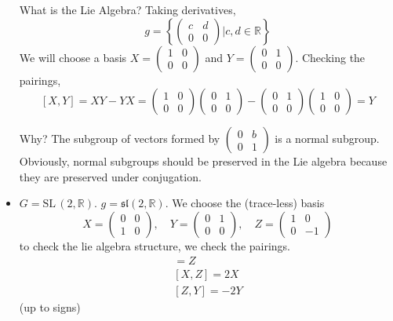 \documentclass[12pt]{article}
\newcommand{\R}{\mathbb{R}}
\newcommand{\SL}{\text{SL}\,}
\newcommand{\slf}{\mathfrak{sl}}
\begin{document}
\begin{itemize}
        What is the Lie Algebra? Taking derivatives, 
        \[g = \left\{\begin{pmatrix}
            c & d\\ 
            0 & 0
        \end{pmatrix} \bigg \vert c, d \in \R\right\}\] 
        We will choose a basis $X = \begin{pmatrix}
            1 & 0\\
            0 & 0
        \end{pmatrix}$ and $Y = \begin{pmatrix}
            0 & 1\\ 
            0 & 0
        \end{pmatrix}$. Checking the pairings, 
        \[[X, Y] = XY - YX = \begin{pmatrix}
            1 & 0\\
            0 & 0
        \end{pmatrix} \begin{pmatrix}
            0 & 1\\
            0 & 0
        \end{pmatrix} - \begin{pmatrix}
            0 & 1\\
            0 & 0
        \end{pmatrix} \begin{pmatrix}
            1 & 0\\
            0 & 0
        \end{pmatrix} = Y\] 

        Why? The subgroup of vectors formed by $\begin{pmatrix} 0 & b\\ 0 & 1\end{pmatrix}$ is a normal subgroup. Obviously, normal subgroups should be preserved in the Lie algebra because they are preserved under conjugation. 
        
        \item $G = \SL(2, \R)$. $g = \slf(2, \R)$. We choose the (trace-less) basis 
        \[X = \begin{pmatrix}
            0 & 0\\
            1 & 0
        \end{pmatrix}, \quad Y = \begin{pmatrix}
            0 & 1\\ 
            0 & 0
        \end{pmatrix}, \quad Z = \begin{pmatrix}
            1 & 0\\ 
            0 & -1
        \end{pmatrix}\] 
        to check the lie algebra structure, we check the pairings. 
        \begin{align*}
            [X, Y] = Z\\ 
            [X, Z] = 2X\\ 
            [Z, Y] = -2Y
        \end{align*}
        (up to signs)
    \end{itemize}
\end{document}
